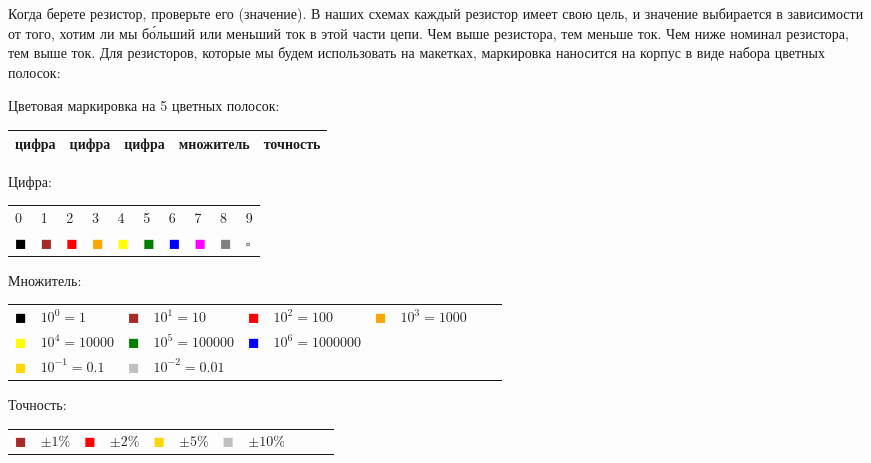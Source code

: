 
Когда берете резистор, проверьте его  (значение). В
наших схемах каждый резистор имеет свою цель, и значение выбирается в
зависимости от того, хотим ли мы б\'{о}льший или меньший ток в этой части цепи.
Чем выше  резистора, тем меньше ток. Чем ниже номинал резистора,
тем выше ток. Для  резисторов,
которые мы будем использовать на макетках, маркировка наносится на корпус в
виде набора цветных полосок:

\bigskip
Цветовая маркировка на 5 цветных полосок:
\begin{tabular}{|l|l|l|l|l|}
\hline
 цифра & цифра & цифра & множитель & точность \\
\hline
\end{tabular}

\bigskip Цифра:
\begin{tabular}{l l l l l l l l l l}
0&1&2&3&4&5&6&7&8&9\\
\textcolor{Black}{$\blacksquare$} &
\textcolor{Brown}{$\blacksquare$} &
\textcolor{Red}{$\blacksquare$} &
\textcolor{Orange}{$\blacksquare$} &
\textcolor{Yellow}{$\blacksquare$} &
\textcolor{Green}{$\blacksquare$} &
\textcolor{Blue}{$\blacksquare$} &
\textcolor{Magenta}{$\blacksquare$} &
\textcolor{Grey}{$\blacksquare$} &
$\square$ \\
\end{tabular}

\bigskip Множитель:
\begin{tabular}{l l l l l l l l l l}
\textcolor{Black}{$\blacksquare$} & $10^{0}=1$ &
\textcolor{Brown}{$\blacksquare$} & $10^{1}=10$ &
\textcolor{Red}{$\blacksquare$} & $10^{2}=100$ &
\textcolor{Orange}{$\blacksquare$} & $10^{3}=1000$ \\
\textcolor{Yellow}{$\blacksquare$} & $10^{4}=10000$ &
\textcolor{Green}{$\blacksquare$} & $10^{5}=100000$ &
\textcolor{Blue}{$\blacksquare$} & $10^{6}=1000000$ \\
\textcolor{Gold}{$\blacksquare$} & $10^{-1}=0.1$ &
\textcolor{Silver}{$\blacksquare$} & $10^{-2}=0.01$ \\
\end{tabular}

\bigskip Точность:
\begin{tabular}{l l l l l l l l l l l}
\textcolor{Brown}{$\blacksquare$} & $\pm 1\%$ &
\textcolor{Red}{$\blacksquare$} & $\pm 2\%$ &
\textcolor{Gold}{$\blacksquare$} & $\pm 5\%$ &
\textcolor{Silver}{$\blacksquare$} & $\pm 10\%$ \\
\end{tabular}

